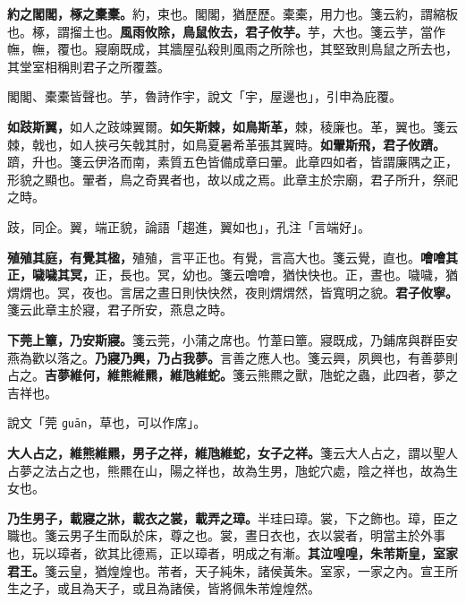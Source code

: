 \textbf{約之閣閣，椓之橐橐。}{\footnotesize 約，束也。閣閣，猶歷歷。橐橐，用力也。箋云約，謂縮板也。椓，謂㨨土也。}\textbf{風雨攸除，鳥鼠攸去，君子攸芋。}{\footnotesize 芋，大也。箋云芋，當作幠，幠，覆也。寢廟既成，其牆屋弘殺則風雨之所除也，其堅致則鳥鼠之所去也，其堂室相稱則君子之所覆蓋。}

\begin{quoting}閣閣、橐橐皆聲也。芋，魯詩作宇，說文「宇，屋邊也」，引申為庇覆。\end{quoting}

\textbf{如跂斯翼，}{\footnotesize 如人之跂竦翼爾。}\textbf{如矢斯棘，如鳥斯革，}{\footnotesize 棘，稜廉也。革，翼也。箋云棘，戟也，如人挾弓矢戟其肘，如鳥夏暑希革張其翼時。}\textbf{如翬斯飛，君子攸躋。}{\footnotesize 躋，升也。箋云伊洛而南，素質五色皆備成章曰翬。此章四如者，皆謂廉隅之正，形貌之顯也。翬者，鳥之奇異者也，故以成之焉。此章主於宗廟，君子所升，祭祀之時。}

\begin{quoting}跂，同企。翼，端正貌，論語「趨進，翼如也」，孔注「言端好」。\end{quoting}

\textbf{殖殖其庭，有覺其楹，}{\footnotesize 殖殖，言平正也。有覺，言高大也。箋云覺，直也。}\textbf{噲噲其正，噦噦其冥，}{\footnotesize 正，長也。冥，幼也。箋云噲噲，猶快快也。正，晝也。噦噦，猶煟煟也。冥，夜也。言居之晝日則快快然，夜則煟煟然，皆寬明之貌。}\textbf{君子攸寧。}{\footnotesize 箋云此章主於寢，君子所安，燕息之時。}

\textbf{下莞上簟，乃安斯寢。}{\footnotesize 箋云莞，小蒲之席也。竹葦曰簟。寢既成，乃鋪席與群臣安燕為歡以落之。}\textbf{乃寢乃興，乃占我夢。}{\footnotesize 言善之應人也。箋云興，夙興也，有善夢則占之。}\textbf{吉夢維何，維熊維羆，維虺維蛇。}{\footnotesize 箋云熊羆之獸，虺蛇之蟲，此四者，夢之吉祥也。}

\begin{quoting}說文「莞 \texttt{ɡuān}，草也，可以作席」。\end{quoting}

\textbf{大人占之，維熊維羆，男子之祥，維虺維蛇，女子之祥。}{\footnotesize 箋云大人占之，謂以聖人占夢之法占之也，熊羆在山，陽之祥也，故為生男，虺蛇穴處，陰之祥也，故為生女也。}

\textbf{乃生男子，載寢之牀，載衣之裳，載弄之璋。}{\footnotesize 半珪曰璋。裳，下之飾也。璋，臣之職也。箋云男子生而臥於床，尊之也。裳，晝日衣也，衣以裳者，明當主於外事也，玩以璋者，欲其比德焉，正以璋者，明成之有漸。}\textbf{其泣喤喤，朱芾斯皇，室家君王。}{\footnotesize 箋云皇，猶煌煌也。芾者，天子純朱，諸侯黃朱。室家，一家之內。宣王所生之子，或且為天子，或且為諸侯，皆將佩朱芾煌煌然。}

